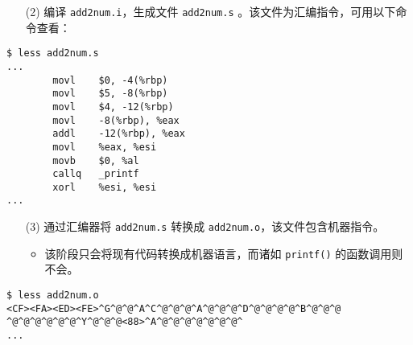 %


\begin{frame}[fragile]\ft{\secname}
\begin{itemize}
\item[(2)]  \quad  编译 \lstinline|add2num.i|，生成文件 \lstinline|add2num.s| 。该文件为汇编指令，可用以下命令查看：
\end{itemize} 
\begin{lstlisting}
$ less add2num.s
...
        movl    $0, -4(%rbp)
        movl    $5, -8(%rbp)
        movl    $4, -12(%rbp)
        movl    -8(%rbp), %eax
        addl    -12(%rbp), %eax
        movl    %eax, %esi
        movb    $0, %al
        callq   _printf
        xorl    %esi, %esi
...      
\end{lstlisting}
\end{frame}


\begin{frame}[fragile]\ft{\secname}
\begin{itemize}
\item[(3)]  \quad 通过汇编器将 \lstinline|add2num.s| 转换成 \lstinline|add2num.o|，该文件包含机器指令。\\[.1in]
\begin{itemize}
	\item  该阶段只会将现有代码转换成机器语言，而诸如 \lstinline|printf()| 的函数调用则不会。
\end{itemize}
\end{itemize}
\pause 
\begin{lstlisting}
$ less add2num.o
<CF><FA><ED><FE>^G^@^@^A^C^@^@^@^A^@^@^@^D^@^@^@^@^B^@^@^@ ^@^@^@^@^@^@^Y^@^@^@<88>^A^@^@^@^@^@^@^@^
...      
\end{lstlisting}

\end{frame}


